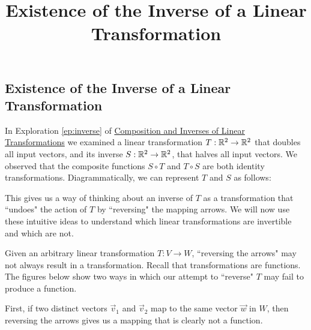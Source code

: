 \documentclass{ximera}
\title{Existence of the Inverse of a Linear Transformation} \license{CC BY-NC-SA 4.0}
\begin{document}
\begin{abstract}
 \end{abstract}
\maketitle

\begin{onlineOnly}
\section*{Existence of the Inverse of a Linear Transformation}
\end{onlineOnly}

In Exploration \ref{ep:inverse} of \href{https://ximera.osu.edu/linearalgebradzv3/LinearAlgebraInteractiveIntro/LTR-0030/main}{Composition and Inverses of Linear Transformations} we examined a linear transformation $T:\mathbb{R}^2\rightarrow \mathbb{R}^2$ that doubles all input vectors, and its inverse $S:\mathbb{R}^2\rightarrow \mathbb{R}^2$, that halves all input vectors.  We observed that the composite functions $S\circ T$ and $T\circ S$ are both identity transformations.  Diagrammatically, we can represent $T$ and $S$ as follows:
 
\begin{center}
 \end{center} 

This gives us a way of thinking about an inverse of $T$ as a transformation that ``undoes" the action of $T$ by ``reversing" the mapping arrows.  We will now use these intuitive ideas to understand which linear transformations are invertible and which are not.

Given an arbitrary linear transformation $T:V\rightarrow W$, ``reversing the arrows"
 may not always result in a transformation. Recall that transformations are functions.  The figures below show two ways in which our attempt to ``reverse" $T$ may fail to produce a function.
 
 First, if two distinct vectors $\vec{v}_1$ and $\vec{v}_2$ map to the same vector $\vec{w}$ in $W$, then reversing the arrows gives us a mapping that is clearly not a function. 
 
\end{document}
